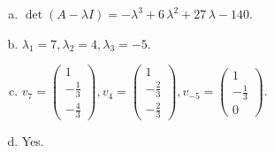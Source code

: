 \begin{questions}
\begin{solution}
\begin{enumerate}[(a)]
\item $\det(A-\lambda I)=-{\lambda}^{3} + 6 \, {\lambda}^{2} + 27 \, {\lambda} - 140$.
\item ${\lambda}_1=7, {\lambda}_2=4, {\lambda}_3=-5$.
\item $v_{7}=\left(\begin{array}{r}
1 \\
-\frac{1}{3} \\
-\frac{4}{3}
\end{array}\right), v_{4}=\left(\begin{array}{r}
1 \\
-\frac{2}{3} \\
-\frac{2}{3}
\end{array}\right), v_{-5}=\left(\begin{array}{r}
1 \\
-\frac{1}{3} \\
0
\end{array}\right)$.
\item Yes.
\end{enumerate}
\end{solution}

\end{questions}

\newpage


\begin{center}
\end{center}

